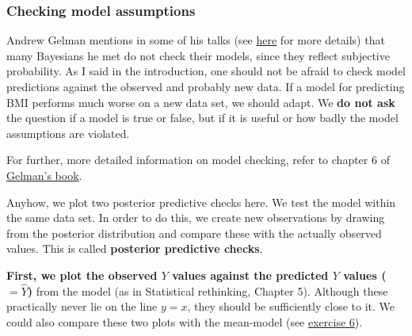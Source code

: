 \documentclass[
]{book}
\begin{document}
\subsubsection{Checking model assumptions}\label{check_model_bayes}

Andrew Gelman mentions in some of his talks (see \href{https://sites.stat.columbia.edu/gelman/research/published/philosophy_chapter.pdf}{here} for more details)
that many Bayesians he met do not check their models, since they reflect subjective probability.
As I said in the introduction, one should not be afraid to check model predictions against the observed
and probably new data. If a model for predicting BMI performs much worse on a new data set,
we should adapt. We \textbf{do not ask} the question if a model is true or false, but if it is useful or
how badly the model assumptions are violated.

For further, more detailed information on model checking, refer to chapter 6 of
\href{https://sites.stat.columbia.edu/gelman/book/BDA3.pdf}{Gelman's book}.

Anyhow, we plot two posterior predictive checks here.
We test the model within the same data set.
In order to do this, we create new observations
by drawing from the posterior distribution and compare these with the actually
observed values. This is called \textbf{posterior predictive checks}.

\textbf{First, we plot the observed \(Y\) values against the predicted \(Y\) values (\(=\hat{Y}\))}
from the model (as in Statistical rethinking, Chapter 5).
Although these practically never lie on the line \(y=x\), they should be sufficiently
close to it. We could also compare these two plots with the mean-model (see \hyperref[exercise6_multiple_regression]{exercise 6}).
\end{document}
